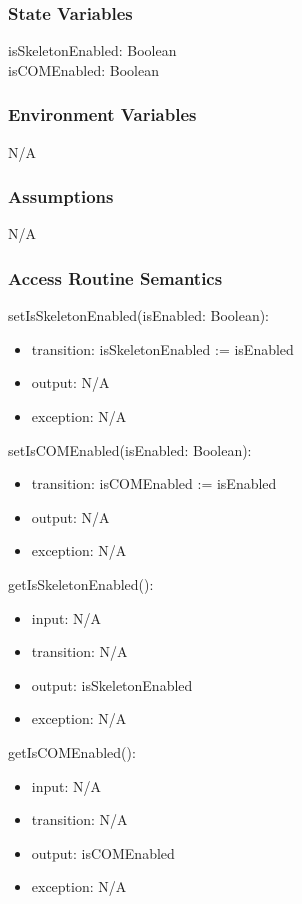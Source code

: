 \documentclass[12pt, titlepage]{article}
\begin{document}
\subsubsection{State Variables}
isSkeletonEnabled: Boolean\\
isCOMEnabled: Boolean

\subsubsection{Environment Variables}
N/A

\subsubsection{Assumptions}
N/A

\subsubsection{Access Routine Semantics}

\noindent setIsSkeletonEnabled(isEnabled: Boolean):
\begin{itemize}
  \item transition: isSkeletonEnabled := isEnabled
  \item output: N/A
  \item exception: N/A
\end{itemize}

\noindent setIsCOMEnabled(isEnabled: Boolean):
\begin{itemize}
  \item transition: isCOMEnabled := isEnabled
  \item output: N/A
  \item exception: N/A
\end{itemize}

\noindent getIsSkeletonEnabled():
\begin{itemize}
  \item input: N/A
  \item transition: N/A
  \item output: isSkeletonEnabled
  \item exception: N/A
\end{itemize}

\noindent getIsCOMEnabled():
\begin{itemize}
  \item input: N/A
  \item transition: N/A
  \item output: isCOMEnabled
  \item exception: N/A
\end{itemize}
\end{document}
